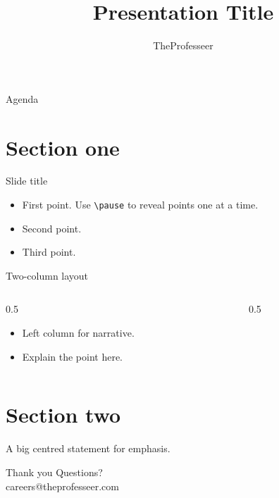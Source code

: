 \documentclass[aspectratio=169]{beamer}
\title{Presentation Title}
\author{TheProfesseer}
\newcommand{\fullpage}[1]{%
  \begin{frame}
    \vfill
    {\Large #1}
    \vfill
  \end{frame}
}
\begin{document}
\begin{frame}
  \titlepage
\end{frame}

\begin{frame}{Agenda}
  \tableofcontents
\end{frame}

\section{Section one}

\begin{frame}{Slide title}
  \begin{itemize}
    \item First point. Use \texttt{\textbackslash pause} to reveal points one at a time.
    \item Second point.
    \item Third point.
  \end{itemize}
\end{frame}

\begin{frame}{Two-column layout}
  \begin{columns}[T]
    \begin{column}{0.5\textwidth}
      \begin{itemize}
        \item Left column for narrative.
        \item Explain the point here.
      \end{itemize}
    \end{column}
    \begin{column}{0.5\textwidth}
      \raggedleft
    \end{column}
  \end{columns}
\end{frame}

\section{Section two}

\fullpage{A big centred statement for emphasis.}

\begin{frame}{Thank you}
  \centering
  \vfill
  {\Large Questions?}\\[1em]
  \footnotesize careers@theprofesseer.com
  \vfill
\end{frame}
\end{document}
